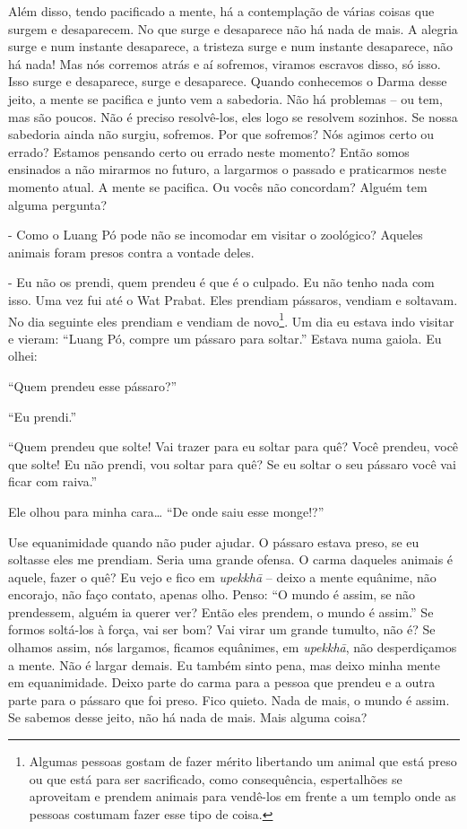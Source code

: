 Além disso, tendo pacificado a mente, há a contemplação de várias
coisas que surgem e desaparecem. No que surge e desaparece não há nada
de mais. A alegria surge e num instante desaparece, a tristeza surge e
num instante desaparece, não há nada! Mas nós corremos atrás e aí
sofremos, viramos escravos disso, só isso. Isso surge e desaparece,
surge e desaparece. Quando conhecemos o Darma desse jeito, a mente se
pacifica e junto vem a sabedoria. Não há problemas – ou tem, mas são
poucos. Não é preciso resolvê-los, eles logo se resolvem sozinhos. Se
nossa sabedoria ainda não surgiu, sofremos. Por que sofremos? Nós
agimos certo ou errado? Estamos pensando certo ou errado neste momento?
Então somos ensinados a não mirarmos no futuro, a largarmos o passado e
praticarmos neste momento atual. A mente se pacifica. Ou vocês não
concordam? Alguém tem alguma pergunta?

- Como o Luang Pó pode não se incomodar em visitar o zoológico?
Aqueles animais foram presos contra a vontade deles.

- Eu não os prendi, quem prendeu é que é o culpado. Eu não tenho
nada com isso. Uma vez fui até o Wat Prabat. Eles prendiam pássaros,
vendiam e soltavam. No dia seguinte eles prendiam e vendiam de
novo\footnote{Algumas pessoas gostam de fazer mérito libertando um
animal que está preso ou que está para ser sacrificado, como
consequência, espertalhões se aproveitam e prendem animais para
vendê-los em frente a um templo onde as pessoas costumam fazer esse
tipo de coisa.}. Um dia eu estava indo visitar e vieram: “Luang Pó,
compre um pássaro para soltar.” Estava numa gaiola. Eu olhei:

“Quem prendeu esse pássaro?”

“Eu prendi.”

“Quem prendeu que solte! Vai trazer para eu soltar para quê? Você
prendeu, você que solte! Eu não prendi, vou soltar para quê? Se eu
soltar o seu pássaro você vai ficar com raiva.”

Ele olhou para minha cara… “De onde saiu esse monge!?” 

Use equanimidade quando não puder ajudar. O pássaro estava preso, se
eu soltasse eles me prendiam. Seria uma grande ofensa. O carma daqueles
animais é aquele, fazer o quê? Eu vejo e fico em \textit{upekkhā }–
deixo a mente equânime, não encorajo, não faço contato, apenas olho.
Penso: “O mundo é assim, se não prendessem, alguém ia querer ver? Então
eles prendem, o mundo é assim.” Se formos soltá-los à força, vai ser
bom? Vai virar um grande tumulto, não é? Se olhamos assim, nós
largamos, ficamos equânimes, em \textit{upekkhā}, não desperdiçamos a
mente. Não é largar demais. Eu também sinto pena, mas deixo minha mente
em equanimidade. Deixo parte do carma para a pessoa que prendeu e a
outra parte para o pássaro que foi preso. Fico quieto. Nada de mais, o
mundo é assim. Se sabemos desse jeito, não há nada de mais. Mais alguma
coisa?

